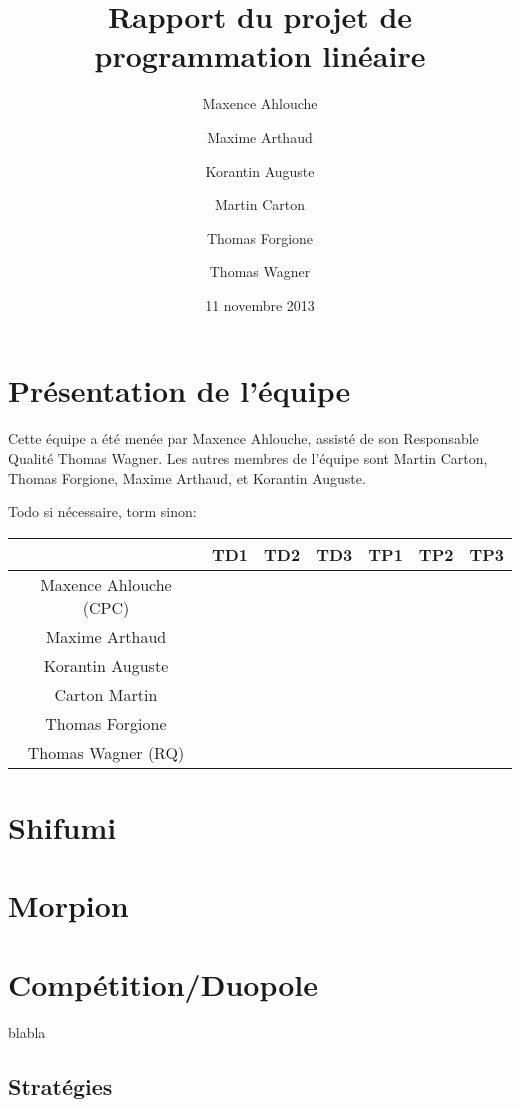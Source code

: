 \documentclass{scrartcl}
\begin{document}
\title{Rapport du projet de programmation linéaire}
\author{Maxence Ahlouche \and Maxime Arthaud \and Korantin Auguste
          \and Martin Carton \and Thomas Forgione \and Thomas Wagner}
\date{11 novembre 2013}
\maketitle
\tableofcontents
\lstlistoflistings
\newpage

\section{Présentation de l'équipe}
  Cette équipe a été menée par Maxence Ahlouche, assisté de son Responsable
  Qualité Thomas Wagner. Les autres membres de l'équipe sont Martin Carton,
  Thomas Forgione, Maxime Arthaud, et Korantin Auguste.

  Todo si nécessaire, torm sinon:
  \begin{table}[h]
    \centering
    \begin{tabular}{|c||c|c|c||c|c|c|}
      \hline
      & TD1 & TD2 & TD3 & TP1 & TP2 & TP3 \\
      \hline\hline
      Maxence Ahlouche (CPC) & & & & & & \\
      \hline
      Maxime Arthaud & & & & & & \\
      \hline
      Korantin Auguste &&&&&& \\
      \hline
      Carton Martin &&&&&&\\
      \hline
      Thomas Forgione &&&&&&\\
      \hline
      Thomas Wagner (RQ) &&&&&&\\
      \hline
    \end{tabular}
  \end{table}

\section{Shifumi}
\section{Morpion}
\section{Compétition/Duopole}
  blabla

  \subsection{Stratégies}
\end{document}
